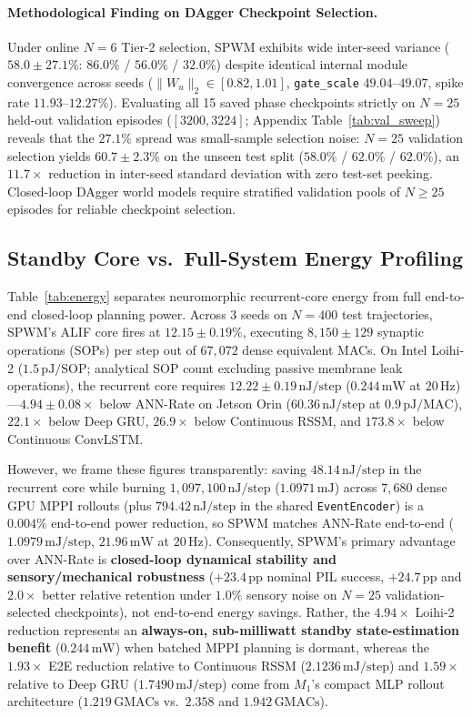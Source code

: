\documentclass[11pt]{article}
\begin{document}
\paragraph{Methodological Finding on DAgger Checkpoint Selection.} Under online $N=6$ Tier-2 selection, SPWM exhibits wide inter-seed variance ($58.0 \pm 27.1\%$: $86.0\%$ / $56.0\%$ / $32.0\%$) despite identical internal module convergence across seeds ($\|W_u\|_2 \in [0.82, 1.01]$, \texttt{gate\_scale} $49.04\text{--}49.07$, spike rate $11.93\text{--}12.27\%$). Evaluating all 15 saved phase checkpoints strictly on $N=25$ held-out validation episodes ($[3200, 3224]$; Appendix Table~\ref{tab:val_sweep}) reveals that the $27.1\%$ spread was small-sample selection noise: $N=25$ validation selection yields $60.7 \pm 2.3\%$ on the unseen test split ($58.0\%$ / $62.0\%$ / $62.0\%$), an $11.7\times$ reduction in inter-seed standard deviation with zero test-set peeking. Closed-loop DAgger world models require stratified validation pools of $N \ge 25$ episodes for reliable checkpoint selection.

\subsection{Standby Core vs.\ Full-System Energy Profiling}

Table~\ref{tab:energy} separates neuromorphic recurrent-core energy from full end-to-end closed-loop planning power. Across 3 seeds on $N=400$ test trajectories, SPWM's ALIF core fires at $12.15 \pm 0.19\%$, executing $8{,}150 \pm 129$ synaptic operations (SOPs) per step out of $67{,}072$ dense equivalent MACs. On Intel Loihi-2 ($1.5\,\text{pJ/SOP}$; analytical SOP count excluding passive membrane leak operations), the recurrent core requires $12.22 \pm 0.19\,\text{nJ/step}$ ($0.244\,\text{mW}$ at $20\,\text{Hz}$)---$4.94 \pm 0.08\times$ below ANN-Rate on Jetson Orin ($60.36\,\text{nJ/step}$ at $0.9\,\text{pJ/MAC}$), $22.1\times$ below Deep GRU, $26.9\times$ below Continuous RSSM, and $173.8\times$ below Continuous ConvLSTM.

However, we frame these figures transparently: saving $48.14\,\text{nJ/step}$ in the recurrent core while burning $1{,}097{,}100\,\text{nJ/step}$ ($1.0971\,\text{mJ}$) across $7{,}680$ dense GPU MPPI rollouts (plus $794.42\,\text{nJ/step}$ in the shared \texttt{EventEncoder}) is a $0.004\%$ end-to-end power reduction, so SPWM matches ANN-Rate end-to-end ($1.0979\,\text{mJ/step}$, $21.96\,\text{mW}$ at $20\,\text{Hz}$). Consequently, SPWM's primary advantage over ANN-Rate is \textbf{closed-loop dynamical stability and sensory/mechanical robustness} ($+23.4\,\text{pp}$ nominal PIL success, $+24.7\,\text{pp}$ and $2.0\times$ better relative retention under $1.0\%$ sensory noise on $N=25$ validation-selected checkpoints), not end-to-end energy savings. Rather, the $4.94\times$ Loihi-2 reduction represents an \textbf{always-on, sub-milliwatt standby state-estimation benefit} ($0.244\,\text{mW}$) when batched MPPI planning is dormant, whereas the $1.93\times$ E2E reduction relative to Continuous RSSM ($2.1236\,\text{mJ/step}$) and $1.59\times$ relative to Deep GRU ($1.7490\,\text{mJ/step}$) come from $M_1$'s compact MLP rollout architecture ($1.219\,\text{GMACs}$ vs.\ $2.358$ and $1.942\,\text{GMACs}$).
\end{document}
